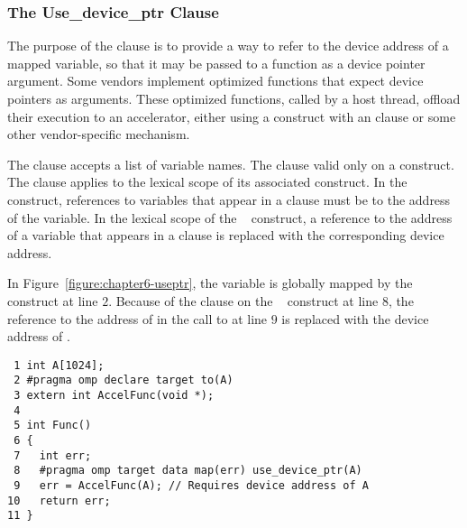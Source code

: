 \subsubsection{The Use\_device\_ptr Clause}
\label{ssec:06.use_device_ptr-clause}

The purpose of the  clause is
to provide a way to refer to the device address of a mapped variable,
so that it may be passed to a function as a device pointer argument.
Some vendors implement optimized functions that expect device pointers as
arguments.  These optimized functions, called by a host thread, offload their
execution to an accelerator, either using a  construct with an
 clause or some other vendor-specific mechanism.

The  clause accepts a list of variable names.  The clause
valid only on a  construct.  The clause applies to the
lexical scope of its associated  construct.  In
the construct, references to variables that appear in a  clause must
be to the address of the variable.  In the lexical scope of the
~ construct, a reference to the address of a variable
that appears in a  clause is replaced with the
corresponding device address.

In Figure~\ref{figure:chapter6-useptr}, the variable  is globally mapped by
the ~ construct at line $2$.  Because of the
 clause on the ~ construct at line
$8$, the reference to the address of  in the call to  at line
$9$ is replaced with the device address of .

\begin{figure*}[!tb]
\begin{verbatim}
 1 int A[1024];
 2 #pragma omp declare target to(A)
 3 extern int AccelFunc(void *);
 4 
 5 int Func()
 6 {
 7   int err;
 8   #pragma omp target data map(err) use_device_ptr(A)
 9   err = AccelFunc(A); // Requires device address of A
10   return err;
11 }
\end{verbatim}
\caption{ \textbf {Example of the use\_device\_ptr clause} -- \small
          Replace the reference to the host address of \texttt{A} in the lexical
          scope of the \texttt{target data} construct with
          the device address of \texttt{A}.
        }
\label{figure:chapter6-useptr}
\end{figure*}

